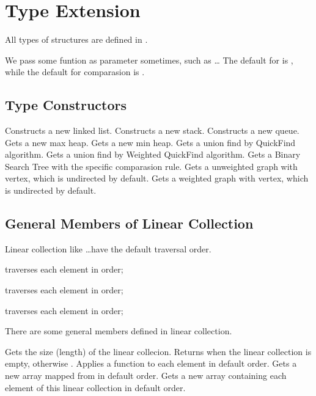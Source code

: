 \section{Type Extension}
All types of structures are defined in .

We pass some funtion as parameter sometimes, such as  \ldots 
The default  for  is , while the default for comparasion is .

\subsection{Type Constructors}
Constructs a new linked list.
Constructs a new stack.
Constructs a new queue.
Gets a new max heap.
Gets a new min heap.
Gets a union find by QuickFind algorithm.
Gets a union find by Weighted QuickFind algorithm.
Gets a Binary Search Tree with the specific comparasion rule.
Gets a unweighted graph with  vertex, which is undirected by default.
Gets a weighted graph with  vertex, which is undirected by default.

\subsection{General Members of Linear Collection}
Linear collection like  \ldots have the default traversal order. 

 traverses each element in  order;

 traverses each element in  order;

 traverses each element in  order;

There are some general members defined in linear collection. 

Gets the size (length) of the linear collecion.
Returns  when the linear collection is empty, otherwise .
Applies a function to each element in default order.
Gets a new array mapped from  in default order.
Gets a new array containing each element of this linear collection in default order.

